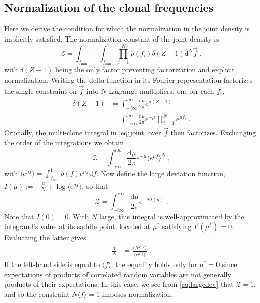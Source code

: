 \subsection*{Normalization of the clonal frequencies}\label{sec:normal}
Here we derive the condition for which the normalization in the joint density is implicitly satisfied. The normalization constant of the joint density is
\begin{equation}
	\mathcal{Z}=\int_{f_\textrm{min}}^1\cdots\int_{f_\textrm{min}}^1\prod_{i=1}^N \rho(f_i)\delta(Z-1)\textrm{d}^N\vec{f} \;\label{eq:joint},
\end{equation}
with $\delta(Z-1)$ being the only factor preventing factorization and explicit normalization. Writing the delta function in its Fourier representation factorizes the single constraint on $\vec{f}$ into $N$ Lagrange multipliers, one for each $f_i$,
\begin{align}
	\delta(Z-1)&=\int_{-i\infty}^{i\infty} \frac{\textrm{d} \mu}{2 \pi}e^{\mu(Z-1)}  \\
	&=\int_{-i\infty}^{i\infty} \frac{\textrm{d} \mu}{2 \pi}e^{-\mu}\prod_{i=1}^N e^{\mu f_i} \;.
\end{align}
Crucially, the multi-clone integral in \cref{eq:joint} over $\vec{f}$ then factorizes. Exchanging the order of the integrations we obtain
\begin{equation}
	\mathcal{Z}=\int_{-i\infty}^{i\infty} \frac{\textrm{d} \mu}{2 \pi} e^{-\mu} \langle e^{\mu f}\rangle^N\;,\label{eq:bigZ}
\end{equation}
with $\langle e^{\mu f}\rangle=\int_{f_\textrm{min}}^1\rho(f)e^{\mu f}\textrm{d}f$. Now define the large deviation function, $I(\mu):=-\frac{\mu}{N}+\log \langle e^{\mu f}\rangle$, so that 
\begin{equation}
	\mathcal{Z}=\int_{-i\infty}^{i\infty} \frac{\textrm{d} \mu}{2 \pi} e^{-N I(\mu)}\;.\label{eq:largedev}
\end{equation}
Note that $I(0)=0$. With $N$ large, this integral is well-approximated by the integrand's value at its saddle point, located at $\mu^*$ satisfying $I'(\mu^*)=0$.  Evaluating the latter gives
\begin{align}
	\frac{1}{N}&=\frac{\langle f e^{\mu^* f}\rangle}{\langle e^{\mu^* f}\rangle}\;.
\end{align} 
If the left-hand side is equal to $\langle f\rangle$, the equality holds only for $\mu^*=0$ since expectations of products of correlated random variables are not generally products of their expectations. 
In this case, we see from \cref{eq:largedev} that $\mathcal{Z}=1$, and so the constraint $N\langle f\rangle=1$ imposes normalization.


